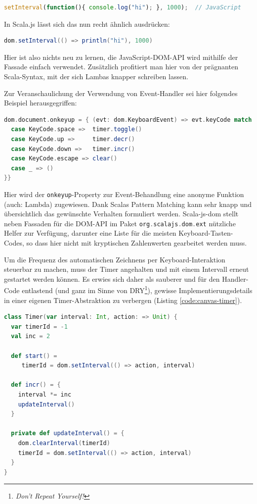 \documentclass[a4paper, 12pt, hidelinks, listof=totoc, listoftables=totoc, bibliography=totoc]{scrreprt}
\newcommand{\scala}[1]{\lstinline[language=Scala, style=inline]|#1|}
\begin{document}
\begin{lstlisting}[language=JavaScript, style=snippet]
setInterval(function(){ console.log("hi"); }, 1000);  // JavaScript
\end{lstlisting}

In Scala.js lässt sich das nun recht ähnlich ausdrücken:

\begin{lstlisting}[language=Scala, style=snippet]
dom.setInterval(() => println("hi"), 1000)
\end{lstlisting}

Hier ist also nichts neu zu lernen, die JavaScript-\ac{DOM}-\ac{API} wird mithilfe der Fassade einfach verwendet. Zusätzlich profitiert man hier von der prägnanten Scala-Syntax, mit der sich Lambas knapper schreiben lassen.

Zur Veranschaulichung der Verwendung von Event-Handler sei hier folgendes Beispiel herausgegriffen:

\begin{lstlisting}[language=Scala, style=snippet]
dom.document.onkeyup = { (evt: dom.KeyboardEvent) => evt.keyCode match {
  case KeyCode.space =>  timer.toggle()
  case KeyCode.up =>     timer.decr()
  case KeyCode.down =>   timer.incr()
  case KeyCode.escape => clear()
  case _ => ()
}}
\end{lstlisting}

Hier wird der \scala{onkeyup}-Property zur Event-Behandlung eine anonyme Funktion (auch: Lambda) zugewiesen. Dank Scalas Pattern Matching kann sehr knapp und übersichtlich das gewünschte Verhalten formuliert werden. Scala-js-dom stellt neben Fassaden für die \ac{DOM}-\ac{API} im Paket \scala{org.scalajs.dom.ext} nützliche Helfer zur Verfügung, darunter eine Liste für die meisten Keyboard-Tasten-Codes, so dass hier nicht mit kryptischen Zahlenwerten gearbeitet werden muss.

Um die Frequenz des automatischen Zeichnens per Keyboard-Interaktion steuerbar zu machen, muss der Timer angehalten und mit einem Intervall erneut gestartet werden können. Es erwies sich daher als sauberer und für den Handler-Code entlastend (und ganz im Sinne von DRY\footnote{\emph{Don't Repeat Yourself!}}), gewisse Implementierungsdetails in einer eigenen Timer-Abstraktion zu verbergen (Listing \ref{code:canvas-timer}).

\begin{lstlisting}[language=Scala, caption={Die Timer-Klasse des Canvas-Beispiels.}, label={code:canvas-timer}]
class Timer(var interval: Int, action: => Unit) {
  var timerId = -1
  val inc = 2

  def start() =
     timerId = dom.setInterval(() => action, interval)
   
  def incr() = {
    interval *= inc
    updateInterval()
  }

  private def updateInterval() = {
    dom.clearInterval(timerId)
    timerId = dom.setInterval(() => action, interval)
  }
}
\end{lstlisting}
\end{document}
